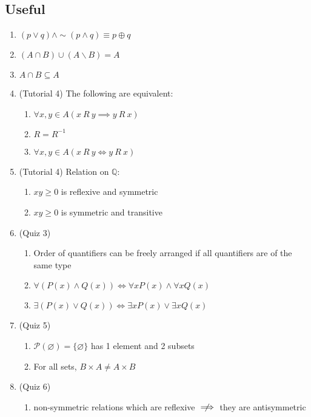 \documentclass[landscape, a4paper]{article}
\newcommand{\Q}{\mathbb{Q}}
\newcommand{\Or}{\vee}
\renewcommand{\P}{\mathcal{P}}
\renewcommand{\and}{\wedge}
\newcommand{\customsection}[1]{%
    \vspace*{-16pt}%
    \section*{#1}%
    \vspace*{-5pt}%
}
\begin{document}
\begin{multicols*}{4}
    \customsection{Useful}
    \begin{enumerate}[wide, labelindent=2pt]
        \item $(p \Or q) \and {\sim}(p \and q)\equiv p \oplus q$
        \item $(A\cap B)\cup (A\backslash B)=A$
        \item $A\cap B\subseteq A$
        \item (Tutorial 4) The following are equivalent:
              \begin{enumerate}
                  \item $\forall x, y\in A (x\ R\ y\implies y\ R\ x)$
                  \item $R=R^{-1}$
                  \item $\forall x,y\in A(x\ R\ y\iff y\ R\ x)$
              \end{enumerate}
        \item (Tutorial 4) Relation on $\Q:$
              \begin{enumerate}
                  \item $xy\geq 0$ is reflexive and symmetric
                  \item $xy\ge 0$ is symmetric and transitive
              \end{enumerate}
        \item (Quiz 3)
              \begin{enumerate}
                  \item Order of quantifiers can be freely arranged if all quantifiers are of the same type
                  \item $\forall (P(x) \and Q(x)) \iff \forall x P(x)\and \forall x Q(x)$
                  \item $\exists (P(x) \Or Q(x)) \iff \exists x P(x)\Or \exists x Q(x)$
              \end{enumerate}
        \item (Quiz 5)
              \begin{enumerate}
                  \item $\P(\varnothing)=\{\varnothing\}$ has 1 element and 2 subsets
                  \item For all sets, $B\times A \neq A \times B$
              \end{enumerate}
        \item (Quiz 6)
              \begin{enumerate}
                  \item non-symmetric relations which are reflexive $\centernot\implies$ they are antisymmetric

\end{enumerate}
\end{enumerate}
\end{multicols*}
\end{document}
